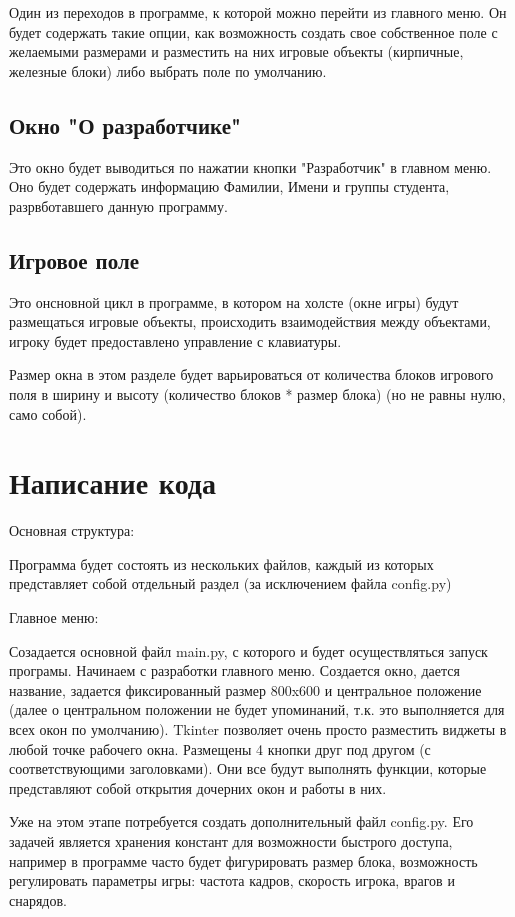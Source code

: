 Один из переходов в программе, к которой можно перейти из главного меню. Он будет содержать такие опции, как возможность создать свое собственное поле с желаемыми размерами и разместить на них игровые объекты (кирпичные, железные блоки) либо выбрать поле по умолчанию.

\subsection{\label{sec:ch01/sec03/sub03}Окно "О разработчике"}

Это окно будет выводиться по нажатии кнопки "Разработчик" в главном меню. Оно будет содержать информацию Фамилии, Имени и группы студента, разрвботавшего данную программу.

\subsection{\label{sec:ch01/sec03/sub04}Игровое поле}

Это онсновной цикл в программе, в котором на холсте (окне игры) будут размещаться игровые объекты, происходить взаимодействия между объектами, игроку будет предоставлено управление с клавиатуры.

Размер окна в этом разделе будет варьироваться от количества блоков игрового поля в ширину и высоту (количество блоков * размер блока) (но не равны нулю, само собой).

\section{\label{sec:ch02/sec03}Написание кода}
Основная структура:

Программа будет состоять из нескольких файлов, каждый из которых представляет собой отдельный раздел (за исключением файла config.py)

Главное меню:

Созадается основной файл main.py, с которого и будет осуществляться запуск програмы. Начинаем с разработки главного меню. Создается окно, дается название, задается фиксированный размер 800x600 и центральное положение (далее о центральном положении не будет упоминаний, т.к. это выполняется для всех окон по умолчанию). Tkinter позволяет очень просто разместить виджеты в любой точке рабочего окна. Размещены 4 кнопки друг под другом (с соответствующими заголовками). Они все будут выполнять функции, которые представляют собой открытия дочерних окон и работы в них.

Уже на этом этапе потребуется создать дополнительный файл config.py. Его задачей является хранения констант для возможности быстрого доступа, например в программе часто будет фигурировать размер блока, возможность регулировать параметры игры: частота кадров, скорость игрока, врагов и снарядов.

